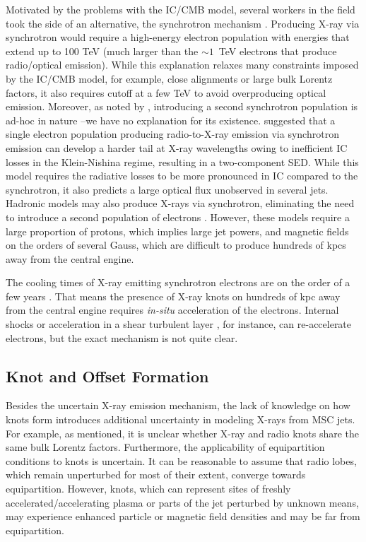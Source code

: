 Motivated by the problems with the IC/CMB model, several workers in the field took the side of an alternative, the synchrotron mechanism \citep[e.g.,][]{jester2006new,hardcastle2006testing,Clautice:2016zai}. Producing X-ray via synchrotron would require a high-energy electron population with energies that extend up to 100 TeV (much larger than the $\sim1$~TeV electrons that produce radio/optical emission). While this explanation relaxes many constraints imposed by the IC/CMB model, for example, close alignments or large bulk Lorentz factors, it also requires cutoff at a few TeV to avoid overproducing optical emission. Moreover, as noted by \citep{schwartz2000chandra}, introducing a second synchrotron population is ad-hoc in nature  \citep{schwartz2000chandra}--we have no explanation for its existence. \citet{dermer2002x} suggested that a single electron population producing radio-to-X-ray emission via synchrotron emission can develop a harder tail at X-ray wavelengths owing to inefficient IC losses in the Klein-Nishina regime, resulting in a two-component SED. While this model requires the radiative losses to be more pronounced in IC compared to the synchrotron, it also predicts a large optical flux unobserved in several jets. Hadronic models may also produce X-rays via synchrotron, eliminating the need to introduce a second population of electrons \citep[e.g.,][]{aharonian2002proton,petropoulou2017tev}. However, these models require a large proportion of protons, which implies large jet powers,  and magnetic fields on the orders of several Gauss, which are difficult to produce hundreds of kpcs away from the central engine.

The cooling times of X-ray emitting synchrotron electrons are on the order of a few years \citep{harris2006x}. That means the presence of X-ray knots on hundreds of kpc away from the central engine requires \textit{in-situ} acceleration of the electrons. Internal shocks \citep[e.g.,][]{stawarz2004multiwavelength,kataoka2008chandra}  or acceleration in a shear turbulent layer \citep[e.g.,][]{ostrowski2002radiation}, for instance, can re-accelerate electrons, but the exact mechanism is not quite clear.

\subsection{Knot and Offset Formation}
Besides the uncertain X-ray emission mechanism, the lack of knowledge on how knots form introduces additional uncertainty in modeling X-rays from MSC jets. For example, as mentioned, it is unclear whether X-ray and radio knots share the same bulk Lorentz factors. Furthermore, the applicability of equipartition conditions to knots is uncertain. It can be reasonable to assume that radio lobes, which remain unperturbed for most of their extent, converge towards equipartition. However, knots, which can represent sites of freshly accelerated/accelerating plasma or parts of the jet perturbed by unknown means, may experience enhanced particle or magnetic field densities and may be far from equipartition.

